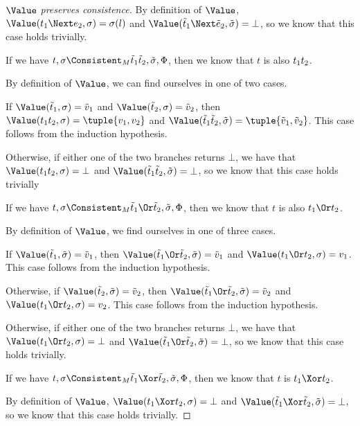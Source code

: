 \begin{proof}[$\Value$ preserves consistence]
{    By definition of $\Value$, $\Value(t_1\Next e_2,\sigma)=\sigma(l)$ and $\Value(\tilde{t}_1\Next \tilde{e}_2,\tilde{\sigma})=\bot$, so we know that this case holds trivially.

    }

    {
    If we have $t,\sigma\Consistent_M\tilde{t}_1\And \tilde{t}_2,\tilde{\sigma},\Phi$, then we know that $t$ is also $t_1\relax t_2$.

    By definition of $\Value$, we can find ourselves in one of two cases.

    If $\Value(\tilde{t}_1,\sigma)=\tilde{v}_1$ and $\Value(\tilde{t}_2,\sigma)=\tilde{v}_2$,
    then $\Value(t_1\And t_2,\sigma)=\tuple{v_1,v_2}$ and $\Value(\tilde{t}_1\And \tilde{t}_2,\tilde{\sigma})=\tuple{\tilde{v}_1,\tilde{v}_2}$.
    This case follows from the induction hypothesis.

    Otherwise, if either one of the two branches returns $\bot$, we have that
    $\Value(t_1\And t_2,\sigma)=\bot$ and $\Value(\tilde{t}_1\And \tilde{t}_2,\tilde{\sigma})=\bot$,
    so we know that this case holds trivially

    }

    {
    If we have $t,\sigma\Consistent_M\tilde{t}_1\Or \tilde{t}_2,\tilde{\sigma},\Phi$, then we know that $t$ is also $t_1\Or t_2$.

    By definition of $\Value$, we find ourselves in one of three cases.

    If $\Value(\tilde{t}_1,\tilde{\sigma})=\tilde{v}_1$, then $\Value(\tilde{t}_1\Or\tilde{t}_2,\tilde{\sigma})=\tilde{v}_1$
    and $\Value(t_1\Or t_2,\sigma)=v_1$. This case follows from the induction hypothesis.

    Otherwise, if $\Value(\tilde{t}_2,\tilde{\sigma})=\tilde{v}_2$, then $\Value(\tilde{t}_1\Or\tilde{t}_2,\tilde{\sigma})=\tilde{v}_2$
    and $\Value(t_1\Or t_2,\sigma)=v_2$. This case follows from the induction hypothesis.

    Otherwise, if either one of the two branches returns $\bot$, we have that
    $\Value(t_1\Or t_2,\sigma)=\bot$ and $\Value(\tilde{t}_1\Or \tilde{t}_2,\tilde{\sigma})=\bot$,
    so we know that this case holds trivially.

    }

    {
    If we have $t,\sigma\Consistent_M\tilde{t}_1\Xor \tilde{t}_2,\tilde{\sigma},\Phi$, then we know that $t$ is $t_1\Xor t_2$.

    By definition of $\Value$, $\Value(t_1\Xor t_2,\sigma)=\bot$ and $\Value(\tilde{t}_1\Xor \tilde{t}_2,\tilde{\sigma})=\bot$, so we know that this case holds trivially.

    }
\end{proof}

